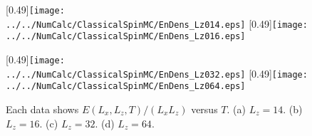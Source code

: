 \begin{figure}[htbp]
	\centering
	\subcaptionbox{\label{fig:ebcheckfor014}}[0.49\linewidth]{\texttt{[image: ../../NumCalc/ClassicalSpinMC/EnDens\_Lz014.eps]}}
	\subcaptionbox{\label{fig:ebcheckfor016}}[0.49\linewidth]{\texttt{[image: ../../NumCalc/ClassicalSpinMC/EnDens\_Lz016.eps]}}
	
	\subcaptionbox{\label{fig:ebcheckfor032}}[0.49\linewidth]{\texttt{[image: ../../NumCalc/ClassicalSpinMC/EnDens\_Lz032.eps]}}
	\subcaptionbox{\label{fig:ebcheckfor064}}[0.49\linewidth]{\texttt{[image: ../../NumCalc/ClassicalSpinMC/EnDens\_Lz064.eps]}}
	
	\caption{Each data shows $E(L_{x}, L_{z}, T)/(L_{x}L_{z})$ versus $T$. (a) $L_{z}=14$. (b) $L_{z}=16$. (c) $L_{z}=32$. (d) $L_{z}=64$.}
	\label{fig:ebcheck2}
\end{figure}

